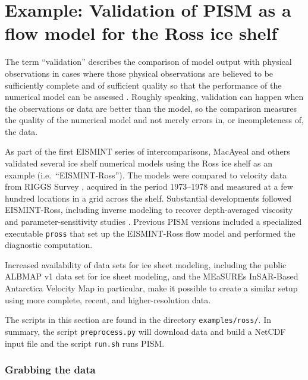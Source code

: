 
\section{Example: Validation of PISM as a flow model for the Ross ice shelf}\label{sec:ross}   

The term ``validation'' describes the comparison of model output with physical observations in cases where those physical observations are believed to be sufficiently complete and of sufficient quality so that the performance of the numerical model can be assessed \cite{Roache,Wesseling}.  Roughly speaking, validation can happen when the observations or data are better than the model, so the comparison measures the quality of the numerical model and not merely errors in, or incompleteness of, the data.

As part of the first EISMINT series of intercomparisons, MacAyeal and others \cite{MacAyealetal} validated several ice shelf numerical models using the Ross ice shelf as an example (i.e.~``EISMINT-Ross'').  The models were compared to velocity data from RIGGS Survey \cite{RIGGS2,RIGGS1}, acquired in the period 1973--1978 and measured at a few hundred locations in a grid across the shelf.  Substantial developments followed EISMINT-Ross, including inverse modeling to recover depth-averaged viscosity \cite{RommelaereMacAyeal} and parameter-sensitivity studies \cite{HumbertGreveHutter}.  Previous PISM versions included a specialized executable \texttt{pross} that set up the EISMINT-Ross flow model and performed the diagnostic computation.

Increased availability of data sets for ice sheet modeling, including the public ALBMAP v1 \cite{LeBrocqetal2010} data set for ice sheet modeling, and the MEaSUREs InSAR-Based Antarctica Velocity Map \cite{Rignotetal2011} in particular, make it possible to create a similar setup using more complete, recent, and higher-resolution data.

The scripts in this section are found in the directory \texttt{examples/ross/}.  In summary, the script \texttt{preprocess.py} will download data and build a NetCDF input file and the script \texttt{run.sh} runs PISM.


\subsubsection*{Grabbing the data}

